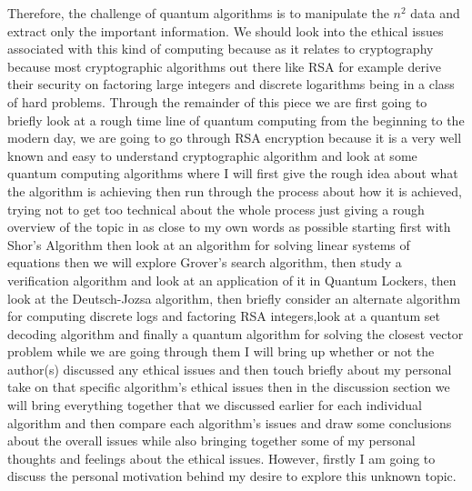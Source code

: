 \documentclass{article}
\begin{document}
Therefore, the challenge of quantum algorithms is to manipulate the $n^2$ data and extract only the important information. We should look into the ethical issues associated with this kind of computing because as it relates to cryptography because most cryptographic algorithms out there like RSA for example derive their security on factoring large integers and discrete logarithms being in a class of hard problems. Through the remainder of this piece we are first going to briefly look at a rough time line of quantum computing from the beginning to the modern day, we are going to go through RSA encryption because it is a very well known and easy to understand cryptographic algorithm and look at some quantum computing algorithms where I will first give the rough idea about what the algorithm is achieving then run through the process about how it is achieved, trying not to get too technical about the whole process just giving a rough overview of the topic in as close to my own words as possible starting first with Shor's Algorithm then  look at an algorithm for solving linear systems of equations then we will explore Grover's search algorithm, then study a verification algorithm and look at an application of it in Quantum Lockers, then look at the Deutsch-Jozsa algorithm, then briefly consider an alternate algorithm for computing discrete logs and factoring RSA integers,look at a quantum set decoding algorithm and finally a quantum algorithm for solving the closest vector problem while we are going through them I will bring up whether or not the author(s) discussed any ethical issues and then touch briefly about my personal take on that specific algorithm's ethical issues then in the discussion section we will bring everything together that we discussed earlier for each individual algorithm and then compare each algorithm's issues and draw some conclusions about the overall issues while also bringing together some of my personal thoughts and feelings about the ethical issues. However, firstly I am going to discuss the personal motivation behind my desire to explore this unknown topic.
\end{document}
